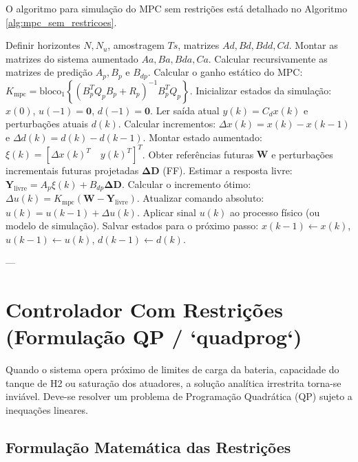\documentclass[12pt,journal,onecolumn]{article}
\begin{document}
O algoritmo para simulação do MPC sem restrições está detalhado no Algoritmo \ref{alg:mpc_sem_restricoes}.

\begin{algorithm}
\caption{Controle Preditivo Incremental Sem Restrições}
\label{alg:mpc_sem_restricoes}
\begin{algorithmic}[1]
\STATE Definir horizontes $N, N_u$, amostragem $Ts$, matrizes $Ad, Bd, Bdd, Cd$.
\STATE Montar as matrizes do sistema aumentado $Aa, Ba, Bda, Ca$.
\STATE Calcular recursivamente as matrizes de predição $A_p, B_p$ e $B_{dp}$.
\STATE Calcular o ganho estático do MPC: $K_{\text{mpc}} = \text{bloco}_1 \left\{ (B_p^T Q_p B_p + R_p)^{-1} B_p^T Q_p \right\}$.
\STATE Inicializar estados da simulação: $x(0)$, $u(-1) = \bm{0}$, $d(-1) = \bm{0}$.
\STATE
{}
\STATE Ler saída atual $y(k) = C_d x(k)$ e perturbações atuais $d(k)$.
\STATE Calcular incrementos: $\Delta x(k) = x(k) - x(k-1)$ e $\Delta d(k) = d(k) - d(k-1)$.
\STATE Montar estado aumentado: $\xi(k) = [\Delta x(k)^T \quad y(k)^T]^T$.
\STATE Obter referências futuras $\bm{W}$ e perturbações incrementais futuras projetadas $\bm{\Delta D}$ (FF).
\STATE Estimar a resposta livre: $\bm{Y}_{\text{livre}} = A_p \xi(k) + B_{dp} \bm{\Delta D}$.
\STATE Calcular o incremento ótimo: $\Delta u(k) = K_{\text{mpc}} (\bm{W} - \bm{Y}_{\text{livre}})$.
\STATE Atualizar comando absoluto: $u(k) = u(k-1) + \Delta u(k)$.
\STATE Aplicar sinal $u(k)$ ao processo físico (ou modelo de simulação).
\STATE Salvar estados para o próximo passo: $x(k-1) \leftarrow x(k)$, $u(k-1) \leftarrow u(k)$, $d(k-1) \leftarrow d(k)$.
\end{algorithmic}
\end{algorithm}

---

\section{Controlador Com Restrições (Formulação QP / `quadprog`)}

Quando o sistema opera próximo de limites de carga da bateria, capacidade do tanque de H2 ou saturação dos atuadores, a solução analítica irrestrita torna-se inviável. Deve-se resolver um problema de Programação Quadrática (QP) sujeto a inequações lineares.

\subsection{Formulação Matemática das Restrições}
\end{document}
